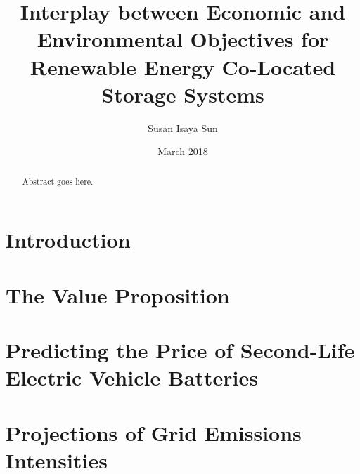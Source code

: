 \documentclass[a4paper]{18monthreport}
\begin{document}
\frontmatter
\title      {Interplay between Economic and Environmental Objectives for Renewable Energy Co-Located Storage Systems}
\date       {March 2018}
\author     {Susan Isaya Sun}

\maketitle

\begin{abstract}
Abstract goes here.
\end{abstract}

\tableofcontents
\listoffigures
\listoftables
\lstlistoflistings
{}
\mainmatter
\chapter{Introduction}
\label{sec:Introduction}


\chapter{The Value Proposition}
\label{sec:The Value Proposition}


\chapter{Predicting the Price of Second-Life Electric Vehicle Batteries}
\label{sec:Predicting the Price of Second-Life Electric Vehicle Batteries}


\chapter{Projections of Grid Emissions Intensities}
\label{sec:Projections of Grid Emissions Intensities}

\end{document}
